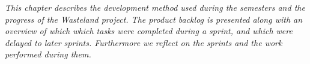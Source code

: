 \emph{This chapter describes the development method used during the semesters and the progress of the Wasteland project. The product backlog is presented along with an overview of which which tasks were completed during a sprint, and which were delayed to later sprints. Furthermore we reflect on the sprints and the work performed during them.}